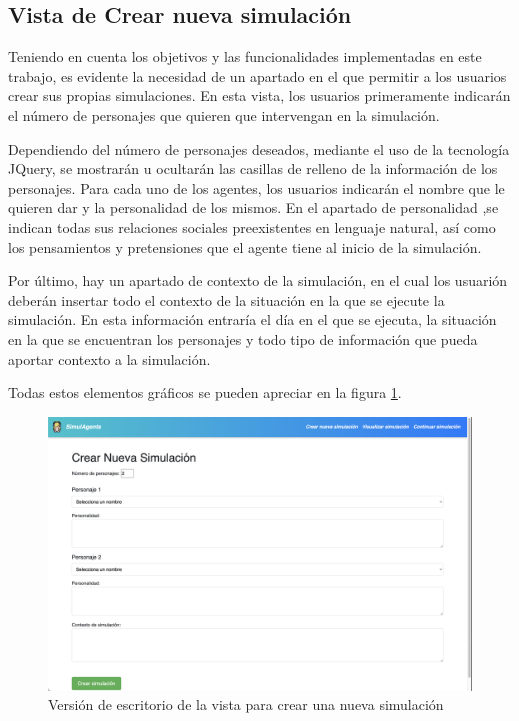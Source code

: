\subsection{Vista de Crear nueva simulación}

Teniendo en cuenta los objetivos y las funcionalidades implementadas en este trabajo, es evidente la necesidad de un apartado en el que permitir a los usuarios crear sus propias simulaciones. En esta vista, los usuarios primeramente indicarán el número de personajes que quieren que intervengan en la simulación.

Dependiendo del número de personajes deseados, mediante el uso de la tecnología JQuery, se mostrarán u ocultarán las casillas de relleno de la información de los personajes. Para cada uno de los agentes, los usuarios indicarán el nombre que le quieren dar y la personalidad de los mismos. En el apartado de personalidad ,se indican todas sus relaciones sociales preexistentes en lenguaje natural, así como los pensamientos y pretensiones que el agente tiene al inicio de la simulación.

Por último, hay un apartado de contexto de la simulación, en el cual los usuarión deberán insertar todo el contexto de la situación en la que se ejecute la simulación. En esta información entraría el día en el que se ejecuta, la situación en la que se encuentran los personajes y todo tipo de información que pueda aportar contexto a la simulación.

Todas estos elementos gráficos se pueden apreciar en la figura \ref{fig:vistaCrearSimulacion}.

\begin{figure}[h]
	\centering
	\includegraphics[width = 1\textwidth]{Imagenes/Vectorial/vistaCrearSimulacion.png}
	\caption{Versión de escritorio de la vista para crear una nueva simulación}
	\label{fig:vistaCrearSimulacion}
\end{figure}

